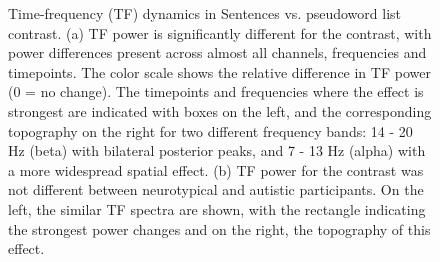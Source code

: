 \begin{figure}[!ht]
	\centering
	\caption{Time-frequency (TF) dynamics in Sentences vs. pseudoword list contrast. (a) TF power is significantly different for the contrast, with power differences present across almost all channels, frequencies and timepoints. The color scale shows the relative difference in TF power (0 = no change). The timepoints and frequencies where the effect is strongest are indicated with boxes on the left, and the corresponding topography on the right for two different frequency bands: 14 - 20 Hz (beta) with bilateral posterior peaks, and 7 - 13 Hz (alpha) with a more widespread spatial effect. (b) TF power for the contrast was not different between neurotypical and autistic participants. On the left, the similar TF spectra are shown, with the rectangle indicating the strongest power changes and on the right, the topography of this effect. }
    \vspace*{-10pt}
	\label{fig:tf-spectrum-full}
\end{figure}


